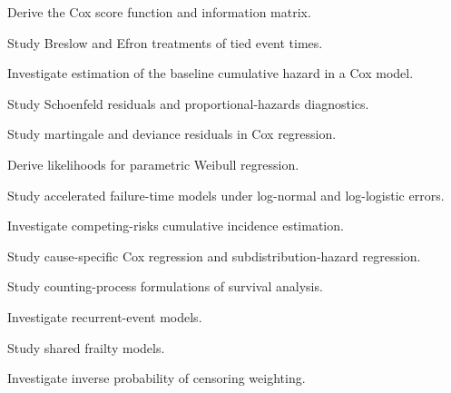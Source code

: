 \begin{exercise}[4]
Derive the Cox score function and information matrix.
\end{exercise}

\begin{exercise}[4]
Study Breslow and Efron treatments of tied event times.
\end{exercise}

\begin{exercise}[4]
Investigate estimation of the baseline cumulative hazard in a Cox model.
\end{exercise}

\begin{exercise}[4]
Study Schoenfeld residuals and proportional-hazards diagnostics.
\end{exercise}

\begin{exercise}[4]
Study martingale and deviance residuals in Cox regression.
\end{exercise}

\begin{exercise}[4]
Derive likelihoods for parametric Weibull regression.
\end{exercise}

\begin{exercise}[4]
Study accelerated failure-time models under log-normal and log-logistic
errors.
\end{exercise}

\begin{exercise}[4]
Investigate competing-risks cumulative incidence estimation.
\end{exercise}

\begin{exercise}[4]
Study cause-specific Cox regression and subdistribution-hazard
regression.
\end{exercise}

\begin{exercise}[4]
Study counting-process formulations of survival analysis.
\end{exercise}

\begin{exercise}[4]
Investigate recurrent-event models.
\end{exercise}

\begin{exercise}[4]
Study shared frailty models.
\end{exercise}

\begin{exercise}[4]
Investigate inverse probability of censoring weighting.
\end{exercise}

